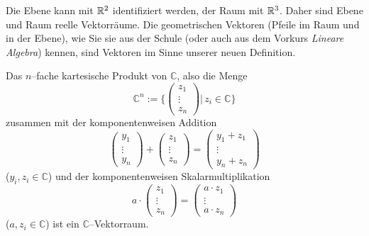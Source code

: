 \begin{beispiel}
Die Ebene kann mit $\mathbb R^2$ identifiziert werden, der Raum mit $\mathbb R^3$. Daher sind Ebene und 
Raum reelle Vektorräume. Die geometrischen Vektoren (Pfeile im Raum und in der Ebene), wie Sie 
sie aus der Schule (oder auch aus dem Vorkurs \textit{Lineare Algebra}) kennen, sind Vektoren im 
Sinne unserer neuen Definition.
\end{beispiel}

\begin{beispiel}\label{LA_vr_cn} Das $n$--fache kartesische Produkt von $\mathbb C$, also die Menge
  	$$ \mathbb C^n := \{ \left( \begin{smallmatrix} z_1 \\ \vdots \\ z_n 
     	\end{smallmatrix} \right) \vert \, z_i \in \mathbb C \} $$
zusammen mit der komponentenweisen Addition 
  	$$ \left( \begin{smallmatrix} y_1 \\ \vdots \\ y_n 
     	\end{smallmatrix} \right) + \left( \begin{smallmatrix} z_1 \\ \vdots \\ z_n 
     	\end{smallmatrix} \right) = \left( \begin{smallmatrix} y_1 + z_1 \\ \vdots \\ 
     	y_n + z_n  \end{smallmatrix} \right) $$ 
($y_i, z_i \in \mathbb C$) und der komponentenweisen Skalarmultiplikation
  	$$ a \cdot \left( \begin{smallmatrix} z_1 \\ \vdots \\ z_n 
     	\end{smallmatrix} \right) = \left( \begin{smallmatrix} a \cdot z_1 \\ \vdots \\ 
     	a \cdot z_n \end{smallmatrix} \right) $$
($a, z_i \in \mathbb C$) ist ein $\mathbb C$--Vektorraum. 
\end{beispiel} 


